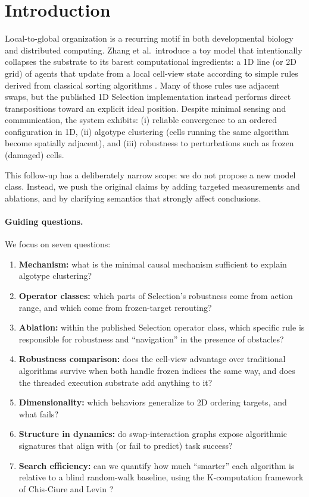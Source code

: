 \documentclass[11pt]{article}
\begin{document}
\section{Introduction}
\label{sec:intro}
Local-to-global organization is a recurring motif in both developmental biology and distributed
computing. Zhang et al.\ introduce a toy model that intentionally collapses the substrate to its
barest computational ingredients: a 1D line (or 2D grid) of agents that update from a local
cell-view state according to simple rules derived from classical sorting algorithms
\cite{zhang2024classical}. Many of those rules use adjacent swaps, but the published 1D Selection
implementation instead performs direct transpositions toward an explicit ideal position.
Despite minimal sensing and communication, the system exhibits:
(i) reliable convergence to an ordered configuration in 1D,
(ii) algotype clustering (cells running the same algorithm become spatially adjacent),
and (iii) robustness to perturbations such as frozen (damaged) cells.

This follow-up has a deliberately narrow scope: we do not propose a new model class.
Instead, we push the original claims by adding targeted measurements and ablations, and by clarifying
semantics that strongly affect conclusions.

\paragraph{Guiding questions.}
We focus on seven questions:
\begin{enumerate}
  \item \textbf{Mechanism:} what is the minimal causal mechanism sufficient to explain algotype
  clustering?
  \item \textbf{Operator classes:} which parts of Selection's robustness come from action range,
  and which come from frozen-target rerouting?
  \item \textbf{Ablation:} within the published Selection operator class, which specific rule is
  responsible for robustness and ``navigation'' in the presence of obstacles?
  \item \textbf{Robustness comparison:} does the cell-view advantage over traditional algorithms
  survive when both handle frozen indices the same way, and does the threaded execution substrate
  add anything to it?
  \item \textbf{Dimensionality:} which behaviors generalize to 2D ordering targets, and what fails?
  \item \textbf{Structure in dynamics:} do swap-interaction graphs expose algorithmic signatures that
  align with (or fail to predict) task success?
  \item \textbf{Search efficiency:} can we quantify how much ``smarter'' each algorithm is relative to
  a blind random-walk baseline, using the K-computation framework of Chis-Ciure and Levin
  \cite{chisciure2025cognition}?
\end{enumerate}
\end{document}
